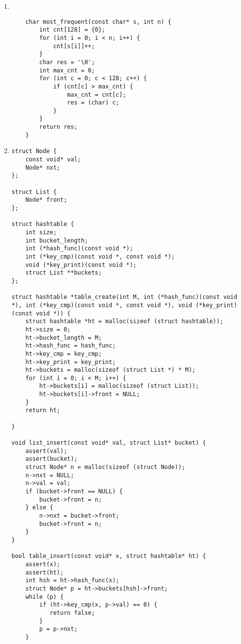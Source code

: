 \documentclass{article}
\begin{document}
\begin{enumerate}
\begin{lstlisting}
    \end{lstlisting}

    \newpage
    \item \\

    \begin{lstlisting}
    char most_frequent(const char* s, int n) {
        int cnt[128] = {0};
        for (int i = 0; i < n; i++) {
            cnt[s[i]]++;
        }
        char res = '\0';
        int max_cnt = 0;
        for (int c = 0; c < 128; c++) {
            if (cnt[c] > max_cnt) {
                max_cnt = cnt[c];
                res = (char) c;
            }
        }
        return res;
    }
    \end{lstlisting}

    \newpage
    \item
    \begin{lstlisting}
struct Node {
    const void* val;
    Node* nxt;
};

struct List {
    Node* front;
};

struct hashtable {
    int size;
    int bucket_length;
    int (*hash_func)(const void *);
    int (*key_cmp)(const void *, const void *);
    void (*key_print)(const void *);
    struct List **buckets;
};

struct hashtable *table_create(int M, int (*hash_func)(const void *), int (*key_cmp)(const void *, const void *), void (*key_print)(const void *)) {
    struct hashtable *ht = malloc(sizeof (struct hashtable));
    ht->size = 0;
    ht->bucket_length = M;
    ht->hash_func = hash_func;
    ht->key_cmp = key_cmp;
    ht->key_print = key_print;
    ht->buckets = malloc(sizeof (struct List *) * M);
    for (int i = 0; i < M; i++) {
        ht->buckets[i] = malloc(sizeof (struct List));
        ht->buckets[i]->front = NULL;
    }
    return ht;

}

void list_insert(const void* val, struct List* bucket) {
    assert(val);
    assert(bucket);
    struct Node* n = malloc(sizeof (struct Node));
    n->nxt = NULL;
    n->val = val;
    if (bucket->front == NULL) {
        bucket->front = n;
    } else {
        n->nxt = bucket->front;
        bucket->front = n;
    }
}

bool table_insert(const void* x, struct hashtable* ht) {
    assert(x);
    assert(ht);
    int hsh = ht->hash_func(x);
    struct Node* p = ht->buckets[hsh]->front;
    while (p) { 
        if (ht->key_cmp(x, p->val) == 0) {
           return false; 
        }
        p = p->nxt;
    }


\end{lstlisting}
\end{enumerate}
\end{document}
